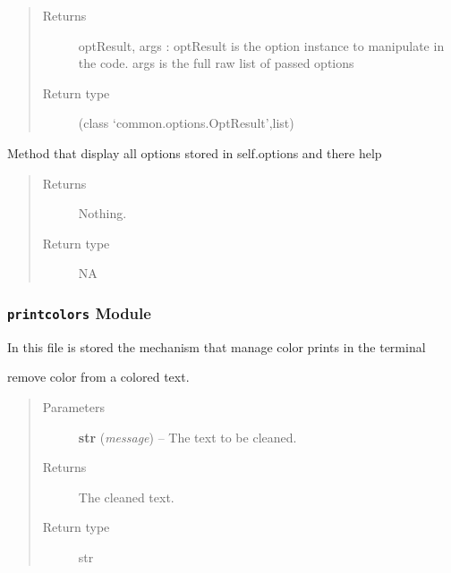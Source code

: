 \documentclass[a4paper,10pt,english]{sphinxmanual}
\begin{document}
\begin{fulllineitems}
\begin{fulllineitems}
\begin{quote}
\begin{description}
\item[{Returns}] \leavevmode
optResult, args : optResult is the option instance 
to manipulate in the code. args 
is the full raw list of passed options

\item[{Return type}] \leavevmode
(class `common.options.OptResult',list)

\end{description}\end{quote}

\end{fulllineitems}


\begin{fulllineitems}
\label{commands/apidoc/src:src.options.Options.print_help}
Method that display all options stored in self.options and there help
\begin{quote}\begin{description}
\item[{Returns}] \leavevmode
Nothing.

\item[{Return type}] \leavevmode
NA

\end{description}\end{quote}

\end{fulllineitems}


\end{fulllineitems}



\subsubsection{\texttt{printcolors} Module}
\label{commands/apidoc/src:printcolors-module}\label{commands/apidoc/src:module-src.printcolors}
In this file is stored the mechanism that manage color prints in the terminal

\begin{fulllineitems}
\label{commands/apidoc/src:src.printcolors.cleancolor}
remove color from a colored text.
\begin{quote}\begin{description}
\item[{Parameters}] \leavevmode
\textbf{str} (\emph{message}) -- The text to be cleaned.

\item[{Returns}] \leavevmode
The cleaned text.

\item[{Return type}] \leavevmode
str

\end{description}\end{quote}

\end{fulllineitems}
\end{document}
